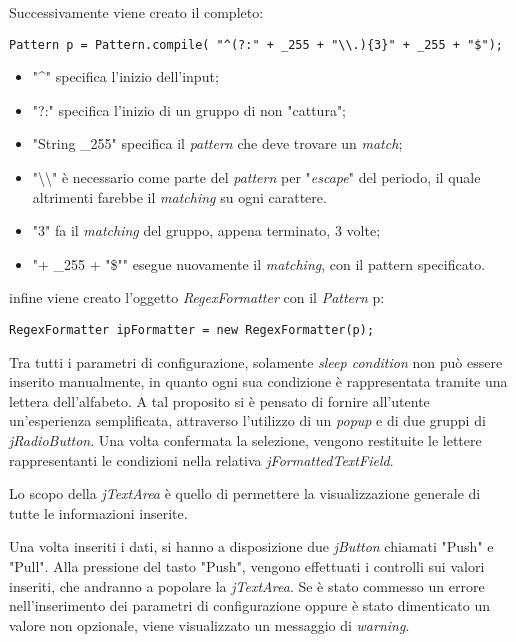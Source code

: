 Successivamente viene creato il  completo:

\vspace{0.5cm}
\begin{lstlisting}
Pattern p = Pattern.compile( "^(?:" + _255 + "\\.){3}" + _255 + "$");
\end{lstlisting}

\begin{itemize}
	\item "\textasciicircum"  specifica l'inizio dell'input;
	\item "?:" specifica l'inizio di un gruppo di non "cattura";
	\item "String \_255" specifica il \textit{pattern} che deve trovare un \textit{match};
	\item "\textbackslash\textbackslash "  \`{e} necessario come parte del \textit{pattern} per "\textit{escape}" del periodo, il quale altrimenti farebbe il \textit{matching} su ogni carattere.
	\item "{3}" fa il \textit{matching} del gruppo, appena terminato, 3 volte; 
	\item "{{+ \_255 + "\$"}}" esegue nuovamente il \textit{matching}, con il pattern specificato.
\end{itemize}

infine viene creato l'oggetto \textit{RegexFormatter} con il \textit{Pattern} p:

\vspace{0.5cm}
\begin{lstlisting}
RegexFormatter ipFormatter = new RegexFormatter(p);
\end{lstlisting}

Tra tutti i parametri di configurazione, solamente \textit{sleep condition} non pu\`{o} essere inserito manualmente, in quanto ogni sua condizione \`{e} rappresentata tramite una lettera dell'alfabeto. A tal proposito si \`{e} pensato di fornire all'utente un'esperienza semplificata, attraverso l'utilizzo di un \textit{popup} e di due gruppi di \textit{jRadioButton}. 
Una volta confermata la selezione, vengono restituite le lettere rappresentanti le condizioni nella relativa \textit{jFormattedTextField}.

Lo scopo della \textit{jTextArea} \`{e} quello di permettere la visualizzazione generale di tutte le informazioni inserite.

Una volta inseriti i dati, si hanno a disposizione due \textit{jButton} chiamati "Push" e "Pull". 
Alla pressione del tasto "Push", vengono effettuati i controlli sui valori inseriti, che andranno a popolare la \textit{jTextArea}. Se \`{e} stato commesso un errore nell'inserimento dei parametri di configurazione oppure \`{e} stato dimenticato un valore non opzionale, viene visualizzato un messaggio di \textit{warning}.

